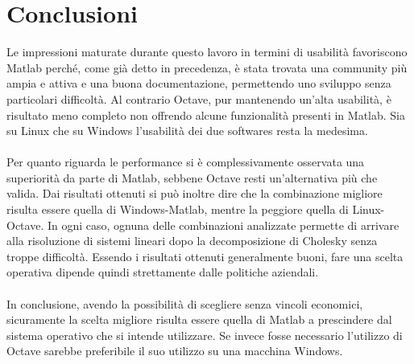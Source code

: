 \section{Conclusioni}\label{conclusioni}
Le impressioni maturate durante questo lavoro in termini di usabilità favoriscono Matlab perché, come già detto in precedenza, è stata trovata una community più ampia e attiva e una buona documentazione, permettendo uno sviluppo senza particolari difficoltà. Al contrario Octave, pur mantenendo un'alta usabilità, è risultato meno completo non offrendo alcune funzionalità presenti in Matlab. Sia su Linux che su Windows l'usabilità dei due softwares resta la medesima.\\\\
Per quanto riguarda le performance si è complessivamente osservata una superiorità da parte di Matlab, sebbene Octave resti un'alternativa più che valida. Dai risultati ottenuti si può inoltre dire che la combinazione migliore risulta essere quella di Windows-Matlab, mentre la peggiore quella di Linux-Octave. In ogni caso, ognuna delle combinazioni analizzate permette di arrivare alla risoluzione di sistemi lineari dopo la decomposizione di Cholesky senza troppe difficoltà. Essendo i risultati ottenuti generalmente buoni, fare una scelta operativa dipende quindi strettamente dalle politiche aziendali. \\\\
In conclusione, avendo la possibilità di scegliere senza vincoli economici, sicuramente la scelta migliore risulta essere quella di Matlab a prescindere dal sistema operativo che si intende utilizzare. Se invece fosse necessario l'utilizzo di Octave sarebbe preferibile il suo utilizzo su una macchina Windows. 